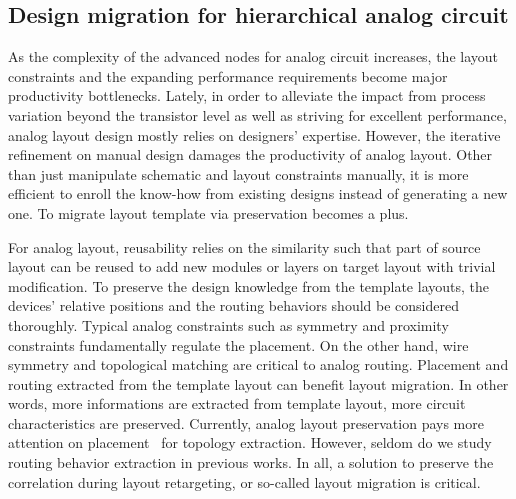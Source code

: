     \subsection{Design migration for hierarchical analog circuit}\label{subsec:DMOverview}
      
      As the complexity of the advanced nodes for analog circuit increases, the layout constraints and the expanding performance requirements become major productivity bottlenecks. Lately, in order to alleviate the impact from process variation beyond the transistor level as well as striving for excellent performance, analog layout design mostly relies on designers' expertise. However, the iterative refinement on manual design damages the productivity of analog layout. Other than just manipulate schematic and layout constraints manually, it is more efficient to enroll the know-how from existing designs instead of generating a new one. To migrate layout template via preservation becomes a plus.

      For analog layout, reusability relies on the similarity such that part of source layout can be reused to add new modules or layers on target layout with trivial modification. To preserve the design knowledge from the template layouts, the devices' relative positions and the routing behaviors should be considered thoroughly. Typical analog constraints such as symmetry and proximity constraints fundamentally regulate the placement. On the other hand, wire symmetry and topological matching are critical to analog routing. Placement and routing extracted from the template layout can benefit layout migration. In other words, more informations are extracted from template layout, more circuit characteristics are preserved. Currently, analog layout preservation pays more attention on placement~\cite{cart-hammouda-dac06,cbc-bhattacharya-dac04,Wang_ALRGP_TODAES2011} for topology extraction. However, seldom do we study routing behavior extraction in previous works. In all, a solution to preserve the correlation during layout retargeting, or so-called layout migration is critical.

